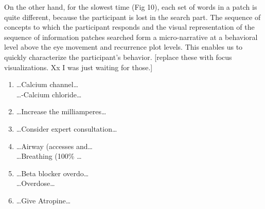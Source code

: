 \documentclass{sigchi}
\begin{document}
On the other hand, for the slowest time (Fig 10), each set of words in a
patch is quite different, because the participant is lost in the search
part. The sequence of concepts to which the participant responds 
and the visual representation of the sequence of information patches 
searched form a micro-narrative at a behavioral level  above the 
eye movement and recurrence plot levels. This enables us to  quickly 
characterize the participant’s behavior. 
[replace these with focus visualizations. Xx I was just waiting for those.]

\begin{enumerate}
	\item \ldots Calcium channel\ldots  \\
		\ldots -Calcium chloride\ldots  \\ 
	  
	\item \ldots Increase the milliamperes\ldots \\

	\item \ldots Consider expert consultation\ldots  
	\item  \ldots Airway (accesses and\ldots  \\
		\ldots Breathing (100\% \ldots \\
	\item	\ldots Beta blocker overdo\ldots  \\
		\ldots Overdose\ldots 
	\item  \ldots Give Atropine\ldots 

\end{enumerate}
\end{document}
